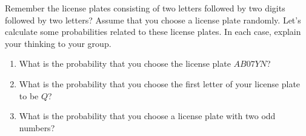 \documentclass[noauthor,nooutcomes, handout]{ximera}
\begin{document}
\begin{problem}
Remember the license plates consisting of two letters followed by two digits followed by two letters? Assume that you choose a license plate randomly. Let's calculate some probabilities related to these license plates. In each case, explain your thinking to your group.
\begin{enumerate}
	\item What is the probability that you choose the license plate $AB07YN$?
	\item What is the probability that you choose the first letter of your license plate to be $Q$?
	\item What is the probability that you choose a license plate with two odd numbers?
\end{enumerate}\vfill
\end{problem}



\newpage
\end{document}
